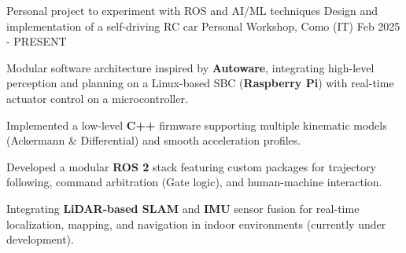 
\cventry
{Personal project to experiment with ROS and AI/ML techniques}
{Design and implementation of a self-driving RC car}
{Personal Workshop, Como (IT)}
{Feb 2025 - PRESENT}
{
    Modular software architecture inspired by \textbf{Autoware}, integrating high-level perception and planning on a Linux-based SBC (\textbf{Raspberry Pi}) with real-time actuator control on a microcontroller.
    \newline
    \vspace{4mm}
    \begin{cvitems}
        \item {Implemented a low-level \textbf{C++} firmware supporting multiple kinematic models (Ackermann \& Differential) and smooth acceleration profiles.}
        \item {Developed a modular \textbf{ROS 2} stack featuring custom packages for trajectory following, command arbitration (Gate logic), and human-machine interaction.}
        \item {Integrating \textbf{LiDAR-based SLAM} and \textbf{IMU} sensor fusion for real-time localization, mapping, and navigation in indoor environments (currently under development).}
    \end{cvitems}
}